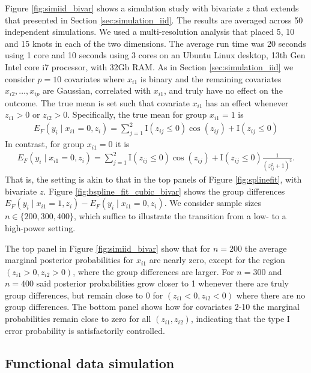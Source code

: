 Figure \ref{fig:simiid_bivar} shows a simulation study with bivariate $z$ that extends that presented in Section \ref{sec:simulation_iid}. The results are averaged across 50 independent simulations.
 We used a multi-resolution analysis that placed 5, 10 and 15 knots in each of the two dimensions. The average run time was 20 seconds using 1 core and 10 seconds using 3 cores on an Ubuntu Linux desktop, 13th Gen Intel core i7 processor, with 32Gb RAM. 
As in Section \ref{sec:simulation_iid} we consider $p=10$ covariates where $x_{i1}$ is binary and the remaining covariates $x_{i2},\ldots,x_{ip}$ are Gaussian, correlated with $x_{i1}$, and truly have no effect on the outcome. 
The true mean is set such that covariate $x_{i1}$ has an effect whenever $z_{i1}>0$ or $z_{i2}>0$.
Specifically, the true mean for group $x_{i1}=1$ is
\begin{align}
E_F(y_i \mid x_{i1}=0, z_i)= 
\sum_{j=1}^2 \mbox{I}(z_{ij} \leq 0) \cos(z_{ij}) + \mbox{I}(z_{ij} \leq 0)
\nonumber
\end{align}
In contrast, for group $x_{i1}=0$ it is
\begin{align}
E_F(y_i \mid x_{i1}=0, z_i)= 
\sum_{j=1}^2 \mbox{I}(z_{ij} \leq 0) \cos(z_{ij}) + \mbox{I}(z_{ij} \leq 0) \frac{1}{(z_{ij}^2+1)^2}.
\nonumber
\end{align}
That is, the setting is akin to that in the top panels of Figure \ref{fig:splinefit}, with bivariate $z$. 
Figure \ref{fig:bspline_fit_cubic_bivar} shows the group differences $E_F(y_i \mid x_{i1}=1, z_i) - E_F(y_i \mid x_{i1}=0, z_i)$.
We consider sample sizes $n \in \{200, 300, 400\}$, which suffice to illustrate the transition from a low- to a high-power setting.

The top panel in Figure \ref{fig:simiid_bivar} show that for $n=200$ the average marginal posterior probabilities for $x_{i1}$ are nearly zero, except for the region $(z_{i1}>0, z_{i2}>0)$, where the group differences are larger.
For $n=300$ and $n=400$ said posterior probabilities grow closer to 1 whenever there are truly group differences, but remain close to 0 for $(z_{i1}<0, z_{i2}<0)$ where there are no group differences.
The bottom panel shows how for covariates 2-10 the marginal probabilities remain close to zero for all $(z_{i1},z_{i2})$, indicating that the type I error probability is satisfactorily controlled.



\subsection{Functional data simulation}
\label{ssec:simulation_fda}

